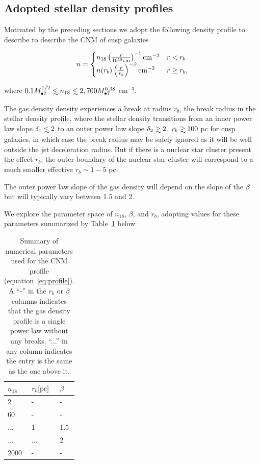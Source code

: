 \documentclass[usenatbib,fleqn]{mn2e}
\newcommand\lsim{\mathrel{\rlap{\lower4pt\hbox{\hskip1pt$\sim$}}
    \raise1pt\hbox{$<$}}}
\newcommand\gsim{\mathrel{\rlap{\lower4pt\hbox{\hskip1pt$\sim$}}
    \raise1pt\hbox{$>$}}}
\newcommand{\Mbh}[1][]{M_{\bullet#1}}
\begin{document}
 


\subsection{Adopted stellar density profiles}
 Motivated by the preceding sections we adopt the following density
 profile to describe to describe the CNM of cusp galaxies

\begin{align}
n=
\begin{cases}
  n_{18} \left(\frac{r}{10^{18} {\rm cm}}\right)^{-1} {\rm cm^{-3}} & r<r_b \\
  n(r_b) \left(\frac{r}{r_b}\right)^{-\beta} {\rm cm^{-3}} & r\geq
  r_b,\\
  \label{eq:profile}
\end{cases}
\end{align}

where $0.1 \Mbh[7]^{1/2} \lsim n_{\rm 18}\lsim 2,700
\Mbh[7]^{0.38} $ cm$^{-3}$.  

The gas density density experiences a break at radius $r_b$, the break
radius in the stellar density profile, where the stellar density
transitions from an inner power law slope $\delta_1\lsim 2$ to an outer
power law slope $\delta_2\gsim 2$. $r_b\gsim 100$ pc for cusp galaxies,
in which case the break radius may be safely ignored as it will be
well outside the jet deceleration radius. But if there is a nuclear
star cluster present the effect $r_b$, the outer boundary of the
nuclear star cluster will correspond to a much smaller effective
$r_b\sim 1-5$ pc. 

The outer power law slope of the gas density will depend on the slope
of the $\beta$ but will typically vary between 1.5 and 2. 

We explore the parameter space of $n_{18}$, $\beta$, and $r_b$,
adopting values for these parameters summarized by
Table~\ref{tab:params} below


\begin{table}
  \caption{\label{tab:params} Summary of numerical parameters used for
    the CNM profile (equation~\eqref{eq:profile}). A ``-'' in the $r_b$
    or $\beta$ columns indicates that the gas density profile is a
    single power law without any breaks. ``...'' in any column
    indicates the entry is the same as the one above it.}
\begin{minipage}{\columnwidth}
\begin{tabular}{|l|l|l|}
$n_{18}$ & $r_b [{\rm pc}]$ & $\beta$\\
\hline
  2     &  -    &  -\\
  60    &  -    &  -\\
  ...   &  1    &  1.5\\
  ...   &  ...   &  2\\
  2000  &  -    &  -\\
\end{tabular}
\end{minipage}
\end{table}
\end{document}
